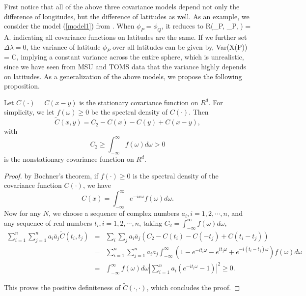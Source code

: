 First notice that all of the above three covariance models depend not only the difference of longitudes, but the difference of latitudes as well. As an example, we consider the model (\ref{model1}) from \cite{Huang2012}. When $\phi_P = \phi_Q$, it reduces to
			\beq
			\nonumber
			R(\phi_P, \phi_P, \Delta \lambda) = A.
			\eeq
indicating all covariance functions on latitudes are the same. If we further set $\Delta \lambda = 0$, the variance of latitude $\phi_P$ over all latitudes can be given by,
			\beq
			\nonumber
			Var(X(P)) = C,
			\eeq
implying a constant variance across the entire sphere, which is unrealistic, since we have seen from MSU and TOMS data that the variance highly depends on latitudes. As a generalization of the above models, we propose the following proposition.
\begin{prop} \label{prop_nonstationary_cov}
Let $C(\cdot) = C(x-y)$ is the stationary covariance function on $R^d$. For simplicity, we let $f(\omega) \ge 0$ be the spectral density of $C(\cdot)$. Then
				\[
					\tilde{C}(x, y) = C_2 - C(x) - C(y) + C(x-y),
				\]
with
				\[
					C_2 \ge \int_{-\infty}^\infty f(\omega)d\omega > 0
				\]
				is the nonstationary covariance function on $R^d$. \\
\end{prop}
\begin{proof} by Bochner's theorem, if $f(\cdot) \ge 0$ is the spectral density of the covariance function $C(\cdot)$, we have
				\[
					C(x) = \int_{-\infty}^\infty e^{-ix\omega}f(\omega)d\omega.
				\]
Now for any $N$, we choose a sequence of complex numbers $a_i, i = 1, 2, \cdots, n$, and any sequence of real numbers $t_i, i = 1, 2, \cdots, n$, taking $C_2 = \int_{-\infty}^\infty f(\omega)d\omega$,
\begin{eqnarray*}
					\sum_{i=1}^n \sum_{j=1}^n a_i \overline{a}_j \tilde{C}(t_i, t_j) &=& \sum_i \sum_j a_i \overline{a}_j (C_2 - C(t_i) - C(-t_j) + C(t_i-t_j)) \\
					&=& \sum_{i=1}^n \sum_{j=1}^n a_i \overline{a}_j \int_{-\infty}^\infty(1-  e^{-it_i\omega} - e^{it_j\omega} + e^{-i(t_i-t_j)\omega})f(\omega)d\omega \\
					&=&\int_{-\infty}^\infty f(\omega)d\omega \left|\sum_{i=1}^n a_i(e^{-it_i\omega} - 1)\right|^2 \ge 0.
\end{eqnarray*}

This proves the positive definiteness of $\tilde{C}(\cdot, \cdot)$, which concludes the proof.

\end{proof}

